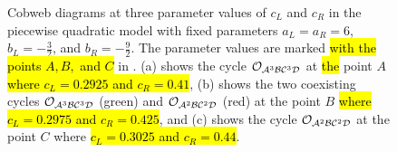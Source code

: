 \begin{figure}
	\centering
	\caption[Cobweb diagrams of the even quadratic model]{
		Cobweb diagrams at three parameter values of $c_L$ and $c_R$ in the piecewise quadratic model with fixed parameters $a_L = a_R = 6$, $b_L = -\frac{3}{2}$, and $b_R = -\frac{9}{2}$.
		The parameter values are marked \hl{with the points $A, B,$ and $C$} in .
		(a) shows the cycle $\mathcal{O}_{\mathcal{A}^3\mathcal{B}\mathcal{C}^3\mathcal{D}}$ at \hl{the} point $A$ \hl{where $c_L = 0.2925$ and $c_R = 0.41$},
		(b) shows the two coexisting cycles $\mathcal{O}_{\mathcal{A}^3\mathcal{B}\mathcal{C}^3\mathcal{D}}$ (green) and $\mathcal{O}_{\mathcal{A}^2\mathcal{B}\mathcal{C}^2\mathcal{D}}$ (red) at the point $B$ \hl{where $c_L = 0.2975$ and $c_R = 0.425$},
		and (c) shows the cycle $\mathcal{O}_{\mathcal{A}^2\mathcal{B}\mathcal{C}^2\mathcal{D}}$ at the point $C$ where \hl{$c_L = 0.3025$ and $c_R = 0.44$}.
	}
	\label{fig:setup.quad.even.cobwebs}
\end{figure}

